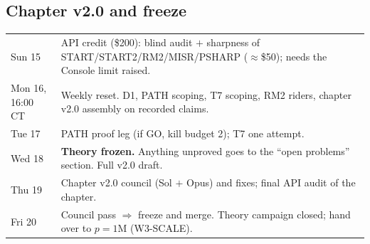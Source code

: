 \documentclass[11pt,a4paper]{article}
\theoremstyle{definition}
\begin{document}
\subsection{Chapter v2.0 and freeze}
{\small
\begin{tabularx}{\linewidth}{@{}l X@{}}
\toprule
Sun 15 & API credit (\$200): blind audit $+$ sharpness of START/START2/RM2/MISR/PSHARP ($\approx$\$50); needs the Console limit raised.\\
Mon 16, 16:00 CT & Weekly reset. D1, PATH scoping, T7 scoping, RM2 riders, chapter v2.0 assembly on recorded claims.\\
Tue 17 & PATH proof leg (if GO, kill budget 2); T7 one attempt.\\
Wed 18 & \textbf{Theory frozen.} Anything unproved goes to the ``open problems'' section. Full v2.0 draft.\\
Thu 19 & Chapter v2.0 council (Sol $+$ Opus) and fixes; final API audit of the chapter.\\
Fri 20 & Council pass $\Rightarrow$ freeze and merge. Theory campaign closed; hand over to $p=1$M (W3-SCALE).\\
\bottomrule
\end{tabularx}}

\end{document}
